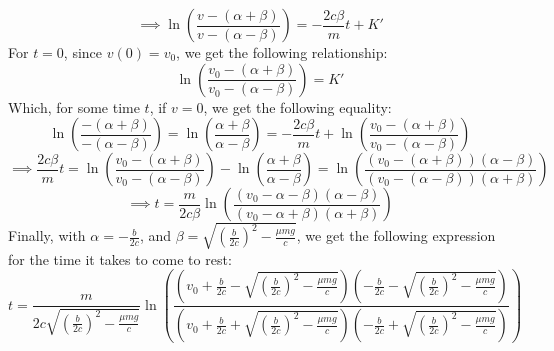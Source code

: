 \documentclass{article}
\begin{document}
$$\implies \ln\left(\frac{v-(\alpha+\beta)}{v-(\alpha-\beta)}\right) = -\frac{2c\beta}{m}t+K'$$
For $t=0$, since $v(0)=v_0$, we get the following relationship:
$$\ln\left(\frac{v_0-(\alpha+\beta)}{v_0-(\alpha-\beta)}\right)=K'$$
Which, for some time $t$, if $v=0$, we get the following equality:
$$\ln\left(\frac{-(\alpha+\beta)}{-(\alpha-\beta)}\right) = \ln\left(\frac{\alpha+\beta}{\alpha-\beta}\right) = -\frac{2c\beta}{m}t + \ln\left(\frac{v_0-(\alpha+\beta)}{v_0-(\alpha-\beta)}\right)$$
$$\implies \frac{2c\beta}{m}t = \ln\left(\frac{v_0-(\alpha+\beta)}{v_0-(\alpha-\beta)}\right)-\ln\left(\frac{\alpha+\beta}{\alpha-\beta}\right)=\ln\left(\frac{(v_0-(\alpha+\beta))(\alpha-\beta)}{(v_0-(\alpha-\beta))(\alpha+\beta)}\right)$$
$$\implies t=\frac{m}{2c\beta}\ln\left(\frac{(v_0-\alpha-\beta)(\alpha-\beta)}{(v_0-\alpha+\beta)(\alpha+\beta)}\right)$$
Finally, with $\alpha=-\frac{b}{2c}$, and $\beta=\sqrt{\left(\frac{b}{2c}\right)^2-\frac{\mu mg}{c}}$, we get the following expression for the time it takes to come to rest:
$$t = \frac{m}{2c\sqrt{\left(\frac{b}{2c}\right)^2-\frac{\mu mg}{c}}}\ln\left(\frac{\left(v_0+\frac{b}{2c}-\sqrt{\left(\frac{b}{2c}\right)^2-\frac{\mu mg}{c}}\right)\left(-\frac{b}{2c}-\sqrt{\left(\frac{b}{2c}\right)^2-\frac{\mu mg}{c}}\right)}{\left(v_0+\frac{b}{2c}+\sqrt{\left(\frac{b}{2c}\right)^2-\frac{\mu mg}{c}}\right)\left(-\frac{b}{2c}+\sqrt{\left(\frac{b}{2c}\right)^2-\frac{\mu mg}{c}}\right)}\right)$$

\end{document}
